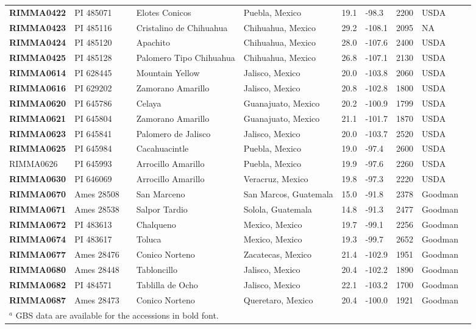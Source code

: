 \begin{table}[h]
\begin{center}
{\begin{tabular}{llllllllll}
{\bf RIMMA0422}	&	PI 485071	&		&	Elotes Conicos	&	Puebla, Mexico	&	19.1 	&	-98.3 	&	2200	&	USDA	\\
{\bf RIMMA0423}	&	PI 485116	&		&	Cristalino de Chihuahua	&	Chihuahua, Mexico	&	29.2 	&	-108.1 	&	2095	&	NA	\\
{\bf RIMMA0424}	&	PI 485120	&		&	Apachito	&	Chihuahua, Mexico	&	28.0 	&	-107.6 	&	2400	&	USDA	\\
{\bf RIMMA0425}	&	PI 485128	&		&	Palomero Tipo Chihuahua	&	Chihuahua, Mexico	&	26.8 	&	-107.1 	&	2130	&	USDA	\\
{\bf RIMMA0614}	&	PI 628445	&		&	Mountain Yellow	&	Jalisco, Mexico	&	20.0 	&	-103.8 	&	2060	&	USDA	\\
{\bf RIMMA0616}	&	PI 629202	&		&	Zamorano Amarillo	&	Jalisco, Mexico	&	20.8 	&	-102.8 	&	1800	&	USDA	\\
{\bf RIMMA0620}	&	PI 645786	&		&	Celaya	&	Guanajuato, Mexico	&	20.2 	&	-100.9 	&	1799	&	USDA	\\
{\bf RIMMA0621}	&	PI 645804	&		&	Zamorano Amarillo	&	Guanajuato, Mexico	&	21.1 	&	-101.7 	&	1870	&	USDA	\\
{\bf RIMMA0623}	&	PI 645841	&		&	Palomero de Jalisco	&	Jalisco, Mexico	&	20.0 	&	-103.7 	&	2520	&	USDA	\\
{\bf RIMMA0625}	&	PI 645984	&		&	Cacahuacintle	&	Puebla, Mexico	&	19.0 	&	-97.4 	&	2600	&	USDA	\\
RIMMA0626	&	PI 645993	&		&	Arrocillo Amarillo	&	Puebla, Mexico	&	19.9 	&	-97.6 	&	2260	&	USDA	\\
{\bf RIMMA0630}	&	PI 646069	&		&	Arrocillo Amarillo	&	Veracruz, Mexico	&	19.8 	&	-97.3 	&	2220	&	USDA	\\
{\bf RIMMA0670}	&	Ames 28508	&		&	San Marceno	&	San Marcos, Guatemala	&	15.0 	&	-91.8 	&	2378	&	Goodman	\\
{\bf RIMMA0671}	&	Ames 28538	&		&	Salpor Tardio	&	Solola, Guatemala	&	14.8 	&	-91.3 	&	2477	&	Goodman	\\
{\bf RIMMA0672}	&	PI 483613	&		&	Chalqueno	&	Mexico, Mexico	&	19.7 	&	-99.1 	&	2256	&	Goodman	\\
{\bf RIMMA0674}	&	PI 483617	&		&	Toluca	&	Mexico, Mexico	&	19.3 	&	-99.7 	&	2652	&	Goodman	\\
{\bf RIMMA0677}	&	Ames 28476 	&		&	Conico Norteno	&	Zacatecas, Mexico	&	21.4 	&	-102.9 	&	1951	&	Goodman	\\
{\bf RIMMA0680}	&	Ames 28448	&		&	Tabloncillo	&	Jalisco, Mexico	&	20.4 	&	-102.2 	&	1890	&	Goodman	\\
{\bf RIMMA0682}	&	PI 484571	&		&	Tablilla de Ocho	&	Jalisco, Mexico	&	22.1 	&	-103.2 	&	1700	&	Goodman	\\
{\bf RIMMA0687}	&	Ames 28473	&		&	Conico Norteno	&	Queretaro, Mexico	&	20.4 	&	-100.0 	&	1921	&	Goodman	\\[-0.1mm]	
	\hline\hline
\multicolumn{9}{l}{$^a$ GBS data are available for the accessions in bold font.}\\
    \end{tabular}}


\end{center}
\end{table}
